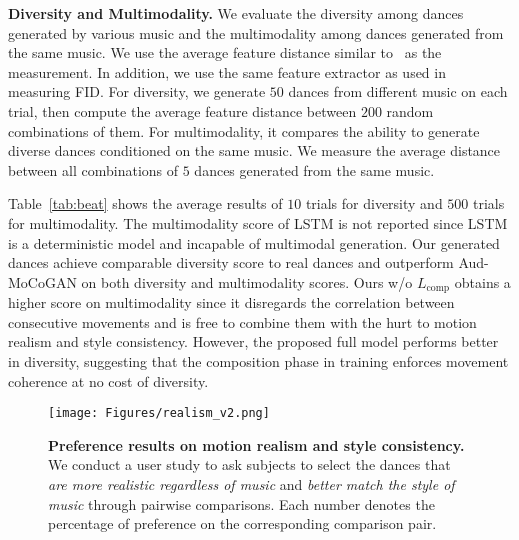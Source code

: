 \documentclass{article}
\newlength\figmargin
\newcommand{\tabref}[1]{Table~\ref{tab:#1}}
\begin{document}
\textbf{Diversity and Multimodality.}
We evaluate the diversity among dances generated by various music and the multimodality among dances generated from the same music.
We use the average feature distance similar to~\cite{zhang2018perceptual} as the measurement. 
In addition, we use the same feature extractor as used in measuring FID.
For diversity, we generate $50$ dances from different music on each trial, then compute the average feature distance between $200$ random combinations of them.
For multimodality, it compares the ability to generate diverse dances conditioned on the same music.
We measure the average distance between all combinations of $5$ dances generated from the same music.


\tabref{beat} shows the average results of $10$ trials for diversity and $500$ trials for multimodality.
The multimodality score of LSTM is not reported since LSTM is a deterministic model and incapable of multimodal generation.
Our generated dances achieve comparable diversity score to real dances and outperform Aud-MoCoGAN on both diversity and multimodality scores.
Ours w/o $L_{\mathrm{comp}}$ obtains a higher score on multimodality since it disregards the correlation between consecutive movements and is free to combine them with the hurt to motion realism and style consistency.
However, the proposed full model performs better in diversity, suggesting that the composition phase in training enforces movement coherence at no cost of diversity.


\begin{figure}
\center
\texttt{[image: Figures/realism\_v2.png]}
\caption{\textbf{Preference results on motion realism and style consistency.}
We conduct a user study to ask subjects to select the dances that \emph{are more realistic regardless of music} and \emph{better match the style of music} through pairwise comparisons.
Each number denotes the percentage of preference on the corresponding comparison pair.
}
\label{fig:userstudy}
\vspace{\figmargin}
\end{figure}
\end{document}
